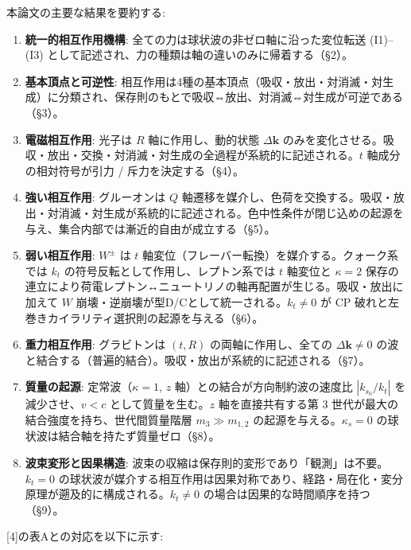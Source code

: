 \documentclass[
  a4paper,11pt]{ltjsarticle}
\theoremstyle{definition}
\theoremstyle{remark}
\begin{document}
本論文の主要な結果を要約する:

\begin{enumerate}
\def\labelenumi{\arabic{enumi}.}
\item
  \textbf{統一的相互作用機構}:
  全ての力は球状波の非ゼロ軸に沿った変位転送 (I1)--(I3)
  として記述され、力の種類は軸の違いのみに帰着する（§2）。
\item
  \textbf{基本頂点と可逆性}:
  相互作用は4種の基本頂点（吸収・放出・対消滅・対生成）に分類され、保存則のもとで吸収⇔放出、対消滅⇔対生成が可逆である（§3）。
\item
  \textbf{電磁相互作用}: 光子は \(R\) 軸に作用し、動的状態
  \(\Delta\mathbf{k}\)
  のみを変化させる。吸収・放出・交換・対消滅・対生成の全過程が系統的に記述される。\(t\)
  軸成分の相対符号が引力 / 斥力を決定する（§4）。
\item
  \textbf{強い相互作用}: グルーオンは \(Q\)
  軸遷移を媒介し、色荷を交換する。吸収・放出・対消滅・対生成が系統的に記述される。色中性条件が閉じ込めの起源を与え、集合内部では漸近的自由が成立する（§5）。
\item
  \textbf{弱い相互作用}: \(W^{\pm}\) は \(t\)
  軸変位（フレーバー転換）を媒介する。クォーク系では \(k_t\)
  の符号反転として作用し、レプトン系では \(t\) 軸変位と \(\kappa = 2\)
  保存の連立により荷電レプトン↔ニュートリノの軸再配置が生じる。吸収・放出に加えて
  \(W\) 崩壊・逆崩壊が型D/Cとして統一される。\(k_t \neq 0\) が CP
  破れと左巻きカイラリティ選択則の起源を与える（§6）。
\item
  \textbf{重力相互作用}: グラビトンは \((t, R)\) の両軸に作用し、全ての
  \(\Delta\mathbf{k} \neq 0\)
  の波と結合する（普遍的結合）。吸収・放出が系統的に記述される（§7）。
\item
  \textbf{質量の起源}: 定常波（\(\kappa = 1\), \(z\)
  軸）との結合が方向制約波の速度比 \(|k_{s_0} / k_t|\)
  を減少させ、\(v < c\) として質量を生む。\(z\) 軸を直接共有する第 3
  世代が最大の結合強度を持ち、世代間質量階層 \(m_3 \gg m_{1,2}\)
  の起源を与える。\(\kappa_s = 0\)
  の球状波は結合軸を持たず質量ゼロ（§8）。
\item
  \textbf{波束変形と因果構造}:
  波束の収縮は保存則的変形であり「観測」は不要。\(k_t = 0\)
  の球状波が媒介する相互作用は因果対称であり、経路・局在化・変分原理が遡及的に構成される。\(k_t \neq 0\)
  の場合は因果的な時間順序を持つ（§9）。
\end{enumerate}

{[}4{]}の表Aとの対応を以下に示す:
\end{document}
